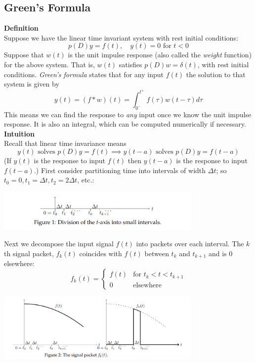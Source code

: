 \documentclass{report}
\begin{document}
\subsection{Green's Formula}
\textbf{Definition}\\
Suppose we have the linear time invariant system with rest initial conditions:
\begin{equation*}
p(D)y=f(t),\quad y(t)=0\text{ for }t<0
\end{equation*}
Suppose that $w(t)$ is the unit impulse response (also called the \textit{weight} function) for the above system. 
That is, $w(t)$ satisfies $p(D)w=\delta(t)$,
with rest initial conditions. \textit{Green's formula} states that for any input $f(t)$ the solution to that
system is given by
\begin{equation*}
y(t)=(f*w)(t)=\int^{t^+}_{0^-}f(\tau)w(t-\tau)d\tau
\end{equation*}
This means we can find the response to \textit{any} input once we know the unit impulse response. It is also
an integral, which can be computed numerically if necessary.\\
\textbf{Intuition}\\
Recall that linear time invariance means 
\begin{equation*}
y(t)\text{ solves }p(D)y=f(t)\implies y(t-a)\text{ solves }p(D)y=f(t-a)
\end{equation*}
(If $y(t)$ is the response to input $f(t)$ then $y(t-a)$ is the response to input $f(t-a)$.) 
First consider partitioning time into intervals of width $\Delta t$; so $t_0=0,t_1=\Delta t,t_2=2\Delta t$, etc.:
\begin{center}
\includegraphics[width=10cm]{56}\\
\end{center}
Next we decompose the input signal $f(t)$ into packets over each interval. The $k$th signal packet, $f_k(t)$
coincides with $f(t)$ between $t_k$ and $t_{k+1}$ and is 0 elsewhere:
\begin{equation*}
f_k(t)=\begin{cases}
f(t)&\text{for }t_k<t<t_{k+1}\\
0&\text{elsewhere}
\end{cases}
\end{equation*}
\begin{center}
\includegraphics[width=10cm]{57}\\
\end{center}
\end{document}
